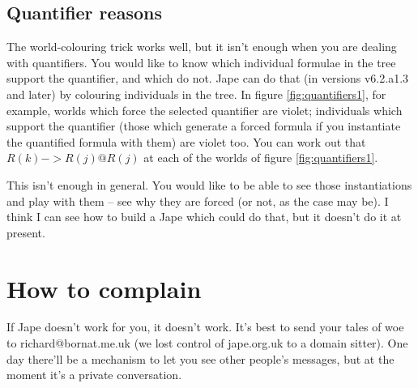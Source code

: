 \documentclass[11pt]{article}
\begin{document}
\subsection{Quantifier reasons}

The world-colouring trick works well, but it isn't enough when you are dealing with quantifiers. You would like to know which individual formulae in the tree support the quantifier, and which do not. Jape can do that (in versions v6.2.a1.3 and later) by colouring individuals in the tree. In figure \ref{fig:quantifiers1}, for example, worlds which force the selected quantifier are violet; individuals which support the quantifier (those which generate a forced formula if you instantiate the quantified formula with them) are violet too. You can work out that $R(k)->R(j)@R(j)$ at each of the worlds of figure \ref{fig:quantifiers1}.

This isn't enough in general. You would like to be able to see those instantiations and play with them -- see why they are forced (or not, as the case may be). I think I can see how to build a Jape which could do that, but it doesn't do it at present.

\section*{How to complain}

If Jape doesn't work for you, it doesn't work. It's best to send your tales of woe to richard@bornat.me.uk (we lost control of jape.org.uk to a domain sitter). One day there'll be a mechanism to let you see other people's messages, but at the moment it's a private conversation.
\end{document}
